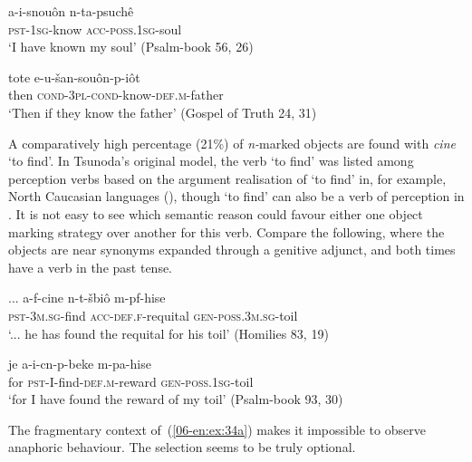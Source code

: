 \documentclass[output=paper]{LSP/langsci}
\begin{document}
\begin{exe}
\ex \label{06-en:ex:32}
\gll a-i-snouôn 		n-ta-psuchê\\
	\textsc{pst-}1\textsc{sg-}know \textsc{acc-poss.1sg-}soul\\
\glt ‘I have known my soul’ (Psalm-book 56, 26)
\end{exe}

\begin{exe}
\ex \label{06-en:ex:33}
\gll tote 	e-u-šan-souôn-p-iôt\\
	then \textsc{cond-}3\textsc{pl-}\textsc{cond-}know-\textsc{def.m-}father\\
\glt ‘Then if they know the father’ (Gospel of Truth 24, 31)
\end{exe}

A comparatively high percentage (21\%) of \textit{n-}marked objects are found with \textit{cine} ‘to find’. In Tsunoda’s original model, the verb ‘to find’ was listed among perception verbs based on the argument realisation of ‘to find’ in, for example, North Caucasian languages (\cf \citealt{Ganenkov2006Experiencer}), though ‘to find’ can also be a verb of perception in  \citep[423]{Simon-Vandenbergen1999Thinking}. It is not easy to see which semantic reason could favour either one object marking strategy over another for this verb. Compare the following, where the objects are near synonyms expanded through a genitive adjunct, and both times have a verb in the past tense.

\begin{exe}
\ex 
\begin{xlist}
\ex \label{06-en:ex:34a}
\gll {\ob}...{\cb} a-f-cine 		n-t-šbiô 				m-pf-his{\ob}e{\cb}\\
  { } 	\textsc{pst-3m.sg-}find \textsc{acc-def}.\textsc{f-}requital \textsc{gen-poss.3m.sg-}toil\\
\glt ‘... he has found the requital for his toil’ (Homilies 83, 19)

\ex\label{06-en:ex:34b}
\gll je 	a-i-cn-p-beke 				m-pa-hise \\
	for \textsc{pst-}I-find-\textsc{def.m-}reward \textsc{gen-}\textsc{poss}.1\textsc{sg-}toil\\
\glt ‘for I have found the reward of my toil’ (Psalm-book 93, 30)

\end{xlist}
\end{exe}

The fragmentary context of~(\ref{06-en:ex:34a}) makes it impossible to observe anaphoric behaviour. The selection seems to be truly optional. 
\end{document}
